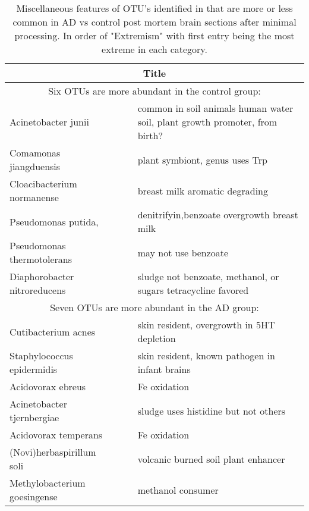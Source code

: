 \documentclass[aps,secnumarabic,balancelastpage,amsmath,amssymb,nofootinbib]{revtex4}
\begin{document}
\begin{table}[H] \centering
\begin{tabular}{|l|r|c|l|}
\hline
\multicolumn{4}{|c|}{Title}\\
\hline
\multicolumn{4}{|c|}{ Six OTUs are more abundant in the control group:  } \\
\hline
Acinetobacter junii &&& common in soil animals human water soil, plant growth promoter, from birth? \\
Comamonas jiangduensis&&& plant symbiont, genus uses Trp  \\
Cloacibacterium normanense&&& breast milk aromatic degrading \\
Pseudomonas putida,&&& denitrifyin,benzoate overgrowth  breast milk  \\
Pseudomonas thermotolerans&&& may not use benzoate \\
Diaphorobacter nitroreducens&&& sludge not benzoate, methanol,  or sugars tetracycline favored  \\
\hline
\multicolumn{4}{|c|}{ Seven OTUs are more abundant in the AD group:  } \\
\hline
Cutibacterium acnes &&& skin resident, overgrowth in 5HT depletion  \\
Staphylococcus epidermidis &&& skin resident, known pathogen in infant brains \\
Acidovorax ebreus &&& Fe oxidation \\
Acinetobacter tjernbergiae &&& sludge uses histidine but not others  \\
Acidovorax temperans&&& Fe oxidation \\
(Novi)herbaspirillum soli &&& volcanic burned soil plant enhancer  \\
Methylobacterium goesingense&&& methanol consumer \\
\hline
\end{tabular}
\caption{ Miscellaneous features of 
OTU's identified in \cite{10.3389/fcimb.2023.1123228} 
that are more or less common in AD vs control post mortem brain
sections after minimal processing. In order of "Extremism"
with first entry being the most extreme in each category. 
}
\label{tab:otuextremes}
\end{table}
\end{document}

